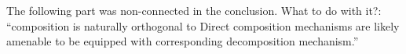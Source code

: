  \brc
 The following part was non-connected in the conclusion. What to do with it?:
 ``composition is naturally orthogonal to 
Direct composition mechanisms are likely amenable to be equipped with corresponding
decomposition mechanism.''
\erc




%
%
%
%
%
